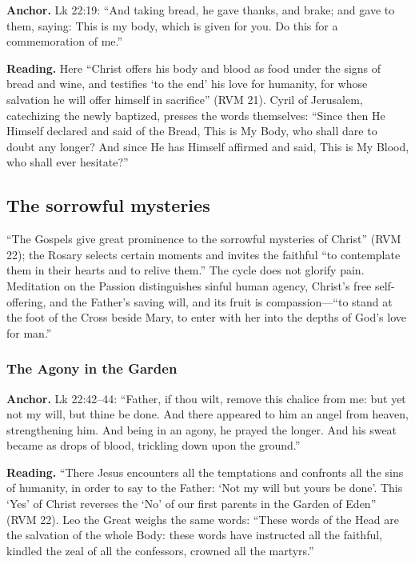\textbf{Anchor.} Lk 22:19: ``And taking bread, he gave thanks, and
brake; and gave to them, saying: This is my body, which is given for
you. Do this for a commemoration of me.''

\textbf{Reading.} Here ``Christ offers his body and blood as food under
the signs of bread and wine, and testifies `to the end' his love for
humanity, for whose salvation he will offer himself in sacrifice'' (RVM
21). Cyril of Jerusalem, catechizing the newly baptized, presses the
words themselves: ``Since then He Himself declared and said of the
Bread, This is My Body, who shall dare to doubt any longer? And since He
has Himself affirmed and said, This is My Blood, who shall ever
hesitate?''

\subsection{The sorrowful mysteries}

``The Gospels give great prominence to the sorrowful mysteries of
Christ'' (RVM 22); the Rosary selects certain moments and invites the
faithful ``to contemplate them in their hearts and to relive them.'' The
cycle does not glorify pain. Meditation on the Passion distinguishes
sinful human agency, Christ's free self-offering, and the Father's saving
will, and its fruit is compassion---``to stand at the foot of the Cross
beside Mary, to enter with her into the depths of God's love for man.''

\subsubsection{The Agony in the Garden}

\textbf{Anchor.} Lk 22:42--44: ``Father, if thou wilt, remove this
chalice from me: but yet not my will, but thine be done. And there
appeared to him an angel from heaven, strengthening him. And being in an
agony, he prayed the longer. And his sweat became as drops of blood,
trickling down upon the ground.''

\textbf{Reading.} ``There Jesus encounters all the temptations and
confronts all the sins of humanity, in order to say to the Father: `Not
my will but yours be done'. This `Yes' of Christ reverses the `No' of our
first parents in the Garden of Eden'' (RVM 22). Leo the Great weighs the
same words: ``These words of the Head are the salvation of the whole
Body: these words have instructed all the faithful, kindled the zeal of
all the confessors, crowned all the martyrs.''

